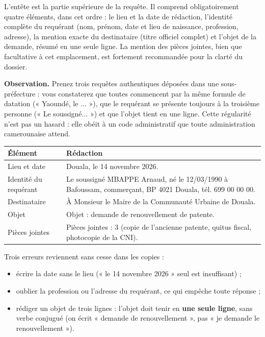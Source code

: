 \documentclass[11pt]{article}
\newcommand{\cle}[1]{{\popxbold\color{popdark}#1}}
\begin{document}
\begin{definition}[L'entête]
L'\cle{entête} est la partie supérieure de la requête. Il comprend obligatoirement quatre éléments, dans cet ordre : le \cle{lieu et la date} de rédaction, l'\cle{identité complète du requérant} (nom, prénom, date et lieu de naissance, profession, adresse), la \cle{mention exacte du destinataire} (titre officiel complet) et l'\cle{objet} de la demande, résumé en une seule ligne. La mention des pièces jointes, bien que facultative à cet emplacement, est fortement recommandée pour la clarté du dossier.
\end{definition}

\textbf{Observation.} Prenez trois requêtes authentiques déposées dans une sous-préfecture : vous constaterez que toutes commencent par la même formule de datation (« Yaoundé, le ... »), que le requérant se présente toujours à la troisième personne (« Le soussigné... ») et que l'objet tient en une ligne. Cette régularité n'est pas un hasard : elle obéit à un code administratif que toute administration camerounaise attend.

\begin{exemplebox}
\begin{center}
\begin{tabularx}{\linewidth}{|l|X|}
\hline
\rowcolor{popblueL} \textbf{Élément} & \textbf{Rédaction} \\
\hline
Lieu et date & Douala, le 14 novembre 2026. \\
\hline
Identité du requérant & Le soussigné MBAPPE Arnaud, né le 12/03/1990 à Bafoussam, commerçant, BP 4021 Douala, tél. 699 00 00 00. \\
\hline
Destinataire & À Monsieur le Maire de la Communauté Urbaine de Douala. \\
\hline
Objet & Objet : demande de renouvellement de patente. \\
\hline
Pièces jointes & Pièces jointes : 3 (copie de l'ancienne patente, quitus fiscal, photocopie de la CNI). \\
\hline
\end{tabularx}
\end{center}
\end{exemplebox}

\begin{attention}
Trois erreurs reviennent sans cesse dans les copies :
\begin{itemize}
\item écrire la date sans le lieu (« le 14 novembre 2026 » seul est insuffisant) ;
\item oublier la profession ou l'adresse du requérant, ce qui empêche toute réponse ;
\item rédiger un objet de trois lignes : l'objet doit tenir en \textbf{une seule ligne}, sans verbe conjugué (on écrit « demande de renouvellement », pas « je demande le renouvellement »).
\end{itemize}
\end{attention}
\end{document}
